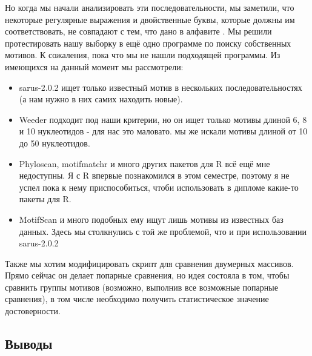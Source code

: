 \documentclass[14pt]{extarticle}
\begin{document}
    \par{Но когда мы начали анализировать эти последовательности, мы заметили, что некоторые регулярные выражения и 
    двойственные буквы, которые должны им соответствовать, не совпадают с тем, что дано в алфавите \cite{memealphabet}. 
    Мы решили протестировать нашу выборку в ещё одно программе по поиску собственных мотивов. К сожаления, пока что мы 
    не нашли подходящей программы. Из имеющихся на данный момент мы рассмотрели:
    \begin{itemize}
        \item sarus-2.0.2 ищет только известный мотив в нескольких последовательностях (а нам нужно в них самих находить
        новые). 
        \item Weeder подходит под наши критерии, но он ищет только мотивы длиной 6, 8 и 10 нуклеотидов - для нас это 
        маловато. мы же искали мотивы длиной от 10 до 50 нуклеотидов.
        \item Phyloscan, motifmatchr и много других пакетов для R всё ещё мне недоступны. Я с R впервые познакомился в 
        этом семестре, поэтому я не успел пока к нему приспособиться, чтоби использовать в дипломе какие-то пакеты для 
        R.
        \item MotifScan и много подобных ему ищут лишь мотивы из известных баз данных. Здесь мы столкнулись с той же 
        проблемой, что и при использовании sarus-2.0.2
    \end{itemize}
    }
    
    \par{Также мы хотим модифицировать скрипт для сравнения двумерных массивов. Прямо сейчас он делает попарные сравнения, но идея состояла в том, чтобы сравнить группы мотивов (возможно, выполнив все возможные попарные сравнения), в том числе необходимо получить статистическое значение достоверности.}
    
    \begin{center}
    \item  \subsection{Выводы}
    \end{center}
\end{document}
